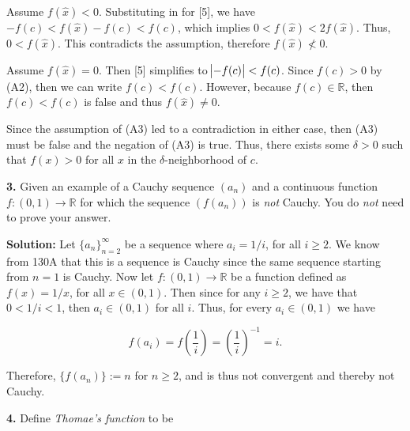 \documentclass[12pt, a4paper]{article}
\begin{document}
\begin{description}
    \newpage
    
    \hspace{4.5mm} Assume $f(\hat{x})<0$. Substituting in for [5], we have $-f(c)<f(\hat{x})-f(c)<f(c)$, which implies $0<f(\hat{x})<2f(\hat{x})$. Thus, $0<f(\hat{x})$. This contradicts the assumption, therefore $f(\hat{x})\not<0$.\par
    \hspace{4.5mm} Assume $f(\hat{x})=0$. Then [5] simplifies to $\abs{-f(c)}<f(c)$. Since $f(c)>0$ by (A2), then we can write $f(c)<f(c)$. However, because $f(c)\in\mathbb{R}$, then $f(c)<f(c)$ is false and thus $f(\hat{x})\neq 0$.\par
    \hspace{4.5mm} Since the assumption of (A3) led to a contradiction in either case, then (A3) must be false and the negation of (A3) is true. Thus, there exists some $\delta>0$ such that $f(x)>0$ for all $x$ in the $\delta$-neighborhood of $c$.\hspace{68mm}\square
     
\end{description}

\noindent\textbf{3.} Given an example of a Cauchy sequence $(a_n)$ and a continuous function $f\colon(0,1)\rightarrow\mathbb{R}$ for which the sequence $(f(a_n))$ is \textit{not} Cauchy. You do \textit{not} need to prove your answer.

\begin{description}
    \item\textbf{Solution: } Let $\{a_n\}_{n=2}^{\infty}$ be a sequence where $a_i=1/i$, for all $i\geq 2$. We know from 130A that this is a sequence is Cauchy since the same sequence starting from $n=1$ is Cauchy. Now let $f\colon(0,1)\rightarrow\mathbb{R}$ be a function defined as $f(x)=1/x$, for all $x\in(0,1)$. Then since for any $i\geq 2$, we have that $0<1/i<1$, then $a_i\in(0,1)$ for all $i$. Thus, for every $a_i\in(0,1)$ we have
    
    \begin{equation*}
        f(a_i)=f(\frac{1}{i})=(\frac{1}{i})^{-1}=i.
    \end{equation*}
    
    \item Therefore, $\{f(a_n)\}:=n$ for $n\geq 2$, and is thus not convergent and thereby not Cauchy.
\end{description}

\noindent\textbf{4.} Define \textit{Thomae's function} to be
\end{document}
